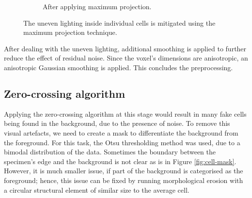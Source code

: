 \documentclass[
  digital,     %
  oneside,     %
  nosansbold,  %
  nocolorbold, %
  lof,         %
  lot,         %
]{fithesis4}
\begin{document}
\begin{figure}
\begin{subfigure}[t]{0.45\linewidth}
        \caption{After applying maximum projection.}
    \end{subfigure}
    \caption{The uneven lighting inside individual cells is mitigated using the
    maximum projection technique.}
    \label{fig:max-proj}
\end{figure}

After dealing with the uneven lighting, additional smoothing is applied
to further reduce the effect of residual noise. Since the voxel's dimensions are
anisotropic, an anisotropic Gaussian smoothing is applied. This concludes the
preprocessing.

\subsection*{Zero-crossing algorithm}
Applying the zero-crossing algorithm at this stage would result in many
fake cells being found in the background, due to the presence of noise. To
remove this visual artefacts, we need to create a mask to differentiate the
background from the foreground. For this task, the Otsu thresholding method was
used, due to a bimodal distribution of the data. Sometimes the boundary between
the specimen's edge and the background is not clear as is in Figure
\ref{fig:cell-mask}. However, it is much smaller issue, if part of the
background is categorised as the foreground; hence, this issue can be fixed by
running morphological erosion with a circular structural element of similar size
to the average cell.
\end{document}
